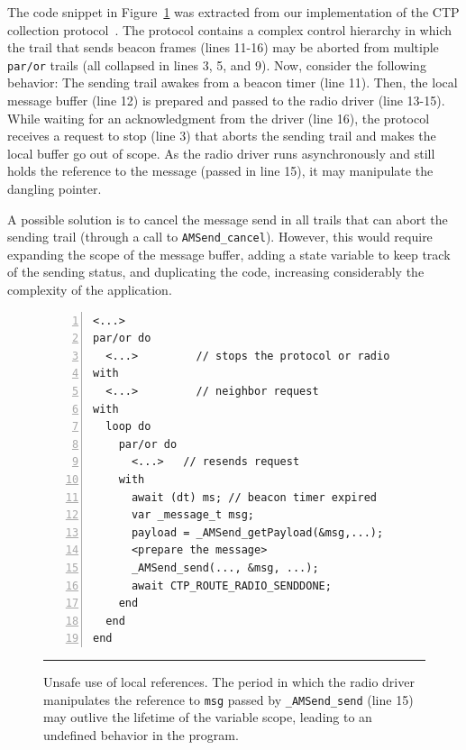 \documentclass[letterpaper]{sig-alternate}
\newcommand{\code}[1] {{\small{\texttt{#1}}}}
\begin{document}
The code snippet in Figure~\ref{lst.local} was extracted from our 
implementation of the CTP collection protocol~\cite{wsn.teps}.
The protocol contains a complex control hierarchy in which the trail that sends 
beacon frames (lines 11-16) may be aborted from multiple \code{par/or} trails 
(all collapsed in lines 3, 5, and 9).
%
Now, consider the following behavior:
The sending trail awakes from a beacon timer (line 11).
Then, the local message buffer (line 12) is prepared and passed to the radio 
driver (line 13-15).
While waiting for an acknowledgment from the driver (line 16), the protocol 
receives a request to stop (line 3) that aborts the sending trail and makes the 
local buffer go out of scope.
As the radio driver runs asynchronously and still holds the reference to the 
message (passed in line 15), it may manipulate the dangling pointer.
%

%
A possible solution is to cancel the message send in all trails that can abort 
the sending trail (through a call to \code{AMSend\_cancel}).
However, this would require expanding the scope of the message buffer, adding a 
state variable to keep track of the sending status, and duplicating the code, 
increasing considerably the complexity of the application.

\begin{figure}[t]
\begin{lstlisting}[numbers=left,xleftmargin=2.5em]
<...>
par/or do
  <...>         // stops the protocol or radio
with
  <...>         // neighbor request
with
  loop do
    par/or do
      <...>   // resends request
    with
      await (dt) ms; // beacon timer expired
      var _message_t msg;
      payload = _AMSend_getPayload(&msg,...);
      <prepare the message>
      _AMSend_send(..., &msg, ...);
      await CTP_ROUTE_RADIO_SENDDONE;
    end
  end
end
\end{lstlisting}
%
\rule{8.5cm}{0.37pt}
\caption{ Unsafe use of local references. \newline
{\small %
The period in which the radio driver manipulates the reference to \code{msg} 
passed by \code{\_AMSend\_send} (line 15) may outlive the lifetime of the 
variable scope, leading to an undefined behavior in the program.
}%
\label{lst.local}
}
\end{figure}
\end{document}
